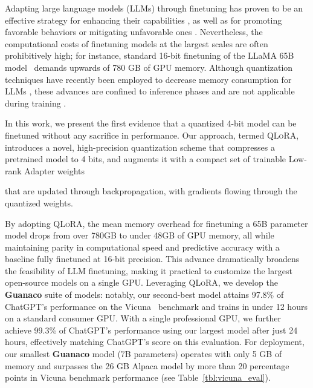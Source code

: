 Adapting large language models (LLMs) through finetuning has proven to be an effective strategy for enhancing their capabilities \citep{min2021metaicl, wei2021finetuned, ouyang2022training, wang2022super, wang2022self, liu2022few}, as well as for promoting favorable behaviors or mitigating unfavorable ones \citep{ouyang2022training,askell2021general,bai2022training}. Nevertheless, the computational costs of finetuning models at the largest scales are often prohibitively high; for instance, standard 16-bit finetuning of the LLaMA 65B model~\citep{touvron2023llama} demands upwards of 780 GB of GPU memory. Although quantization techniques have recently been employed to decrease memory consumption for LLMs \citep{dettmers2022llm, dettmers2022case, frantar2022gptq, xiao2022smoothquant}, these advances are confined to inference phases and are not applicable during training \citep{wortsman2023stable}.

In this work, we present the first evidence that a quantized 4-bit model can be finetuned without any sacrifice in performance. Our approach, termed \textsc{QLoRA}, introduces a novel, high-precision quantization scheme that compresses a pretrained model to 4 bits, and augments it with a compact set of trainable Low-rank Adapter weights \citep{hu2021lora} 

that are updated through backpropagation, with gradients flowing through the quantized weights.

By adopting \textsc{QLoRA}, the mean memory overhead for finetuning a 65B parameter model drops from over 780GB to under 48GB of GPU memory, all while maintaining parity in computational speed and predictive accuracy with a baseline fully finetuned at 16-bit precision. This advance dramatically broadens the feasibility of LLM finetuning, making it practical to customize the largest open-source models on a single GPU. Leveraging \textsc{QLoRA}, we develop the \textbf{Guanaco} suite of models: notably, our second-best model attains 97.8\% of ChatGPT’s performance on the Vicuna~\citep{vicuna2023} benchmark and trains in under 12 hours on a standard consumer GPU. With a single professional GPU, we further achieve 99.3\% of ChatGPT’s performance using our largest model after just 24 hours, effectively matching ChatGPT’s score on this evaluation. For deployment, our smallest \textbf{Guanaco} model (7B parameters) operates with only 5 GB of memory and surpasses the 26 GB Alpaca model by more than 20 percentage points in Vicuna benchmark performance (see Table~\ref{tbl:vicuna_eval}).

